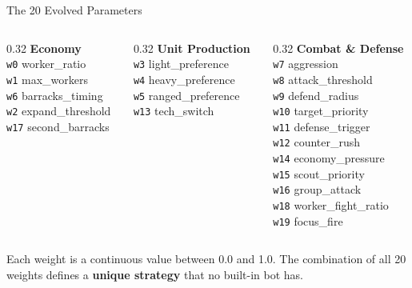 \documentclass[aspectratio=169, 10pt]{beamer}
\begin{document}
\begin{frame}{The 20 Evolved Parameters}

{\small
\begin{columns}[T]

\begin{column}{0.32\textwidth}
\textbf{\textcolor{amritaMaroon}{Economy}}\\[0.1cm]
\texttt{w0} worker\_ratio\\
\texttt{w1} max\_workers\\
\texttt{w6} barracks\_timing\\
\texttt{w2} expand\_threshold\\
\texttt{w17} second\_barracks
\end{column}

\begin{column}{0.32\textwidth}
\textbf{\textcolor{amritaMaroon}{Unit Production}}\\[0.1cm]
\texttt{w3} light\_preference\\
\texttt{w4} heavy\_preference\\
\texttt{w5} ranged\_preference\\
\texttt{w13} tech\_switch
\end{column}

\begin{column}{0.32\textwidth}
\textbf{\textcolor{amritaMaroon}{Combat \& Defense}}\\[0.1cm]
\texttt{w7} aggression\\
\texttt{w8} attack\_threshold\\
\texttt{w9} defend\_radius\\
\texttt{w10} target\_priority\\
\texttt{w11} defense\_trigger\\
\texttt{w12} counter\_rush\\
\texttt{w14} economy\_pressure\\
\texttt{w15} scout\_priority\\
\texttt{w16} group\_attack\\
\texttt{w18} worker\_fight\_ratio\\
\texttt{w19} focus\_fire
\end{column}

\end{columns}
}

\vspace{0.4cm}
Each weight is a continuous value between 0.0 and 1.0. The combination of all 20 weights defines a \textbf{unique strategy} that no built-in bot has.

\end{frame}
\end{document}
